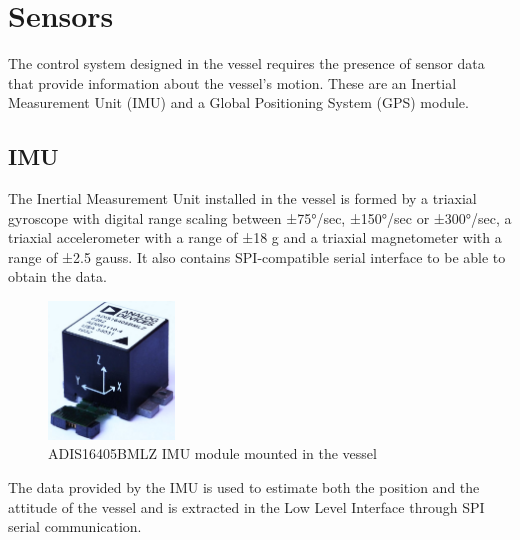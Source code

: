 \section{Sensors}\label{sec:sensors}

The control system designed in the vessel requires the presence of sensor data that provide information about the vessel's motion. These are an Inertial Measurement Unit (IMU) and a Global Positioning System (GPS) module.

\subsection{IMU}

The Inertial Measurement Unit installed in the vessel is formed by a triaxial gyroscope with digital range scaling between ±75°/sec, ±150°/sec or ±300°/sec, a triaxial accelerometer with a range of ±18 g and a triaxial magnetometer with a range of ±\num{2.5} gauss. It also contains SPI-compatible serial interface to be able to obtain the data. \cite{IMUDatasheet}
%
\begin{figure}[H]
	\includegraphics[width=0.3\textwidth]{figures/IMU}
	\caption{ADIS16405BMLZ IMU module mounted in the vessel \cite{IMUFigure}}
	\label{fig:IMU}
\end{figure}
%
The data provided by the IMU is used to estimate both the position and the attitude of the vessel and is extracted in the Low Level Interface through SPI serial communication.


